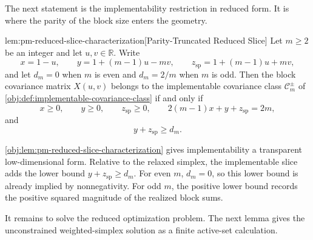 The next statement is the implementability restriction in reduced form. It is where the parity of the block size enters the geometry.

\begin{lemmav}{lem:pm-reduced-slice-characterization}[Parity-Truncated Reduced Slice]
Let \(m\ge 2\) be an integer and let \(u,v\in\mathbb R\). Write
\[
x=1-u,\qquad
y=1+(m-1)u-mv,\qquad
z_{\mathrm{sp}}=1+(m-1)u+mv,
\]
and let \(d_m=0\) when \(m\) is even and \(d_m=2/m\) when \(m\) is odd. Then the block covariance matrix \(X(u,v)\) belongs to the implementable covariance class \(\mathcal C_m^{\pm}\) of \cref{obj:def:implementable-covariance-class} if and only if
\[
x\ge 0,\qquad y\ge 0,\qquad z_{\mathrm{sp}}\ge 0,\qquad
2(m-1)x+y+z_{\mathrm{sp}}=2m,
\]
and
\[
y+z_{\mathrm{sp}}\ge d_m .
\]
\end{lemmav}

\cref{obj:lem:pm-reduced-slice-characterization} gives implementability a transparent low-dimensional form. Relative to the relaxed simplex, the implementable slice adds the lower bound \(y+z_{\mathrm{sp}}\ge d_m\). For even \(m\), \(d_m=0\), so this lower bound is already implied by nonnegativity. For odd \(m\), the positive lower bound records the positive squared magnitude of the realized block sums.

It remains to solve the reduced optimization problem. The next lemma gives the unconstrained weighted-simplex solution as a finite active-set calculation.

